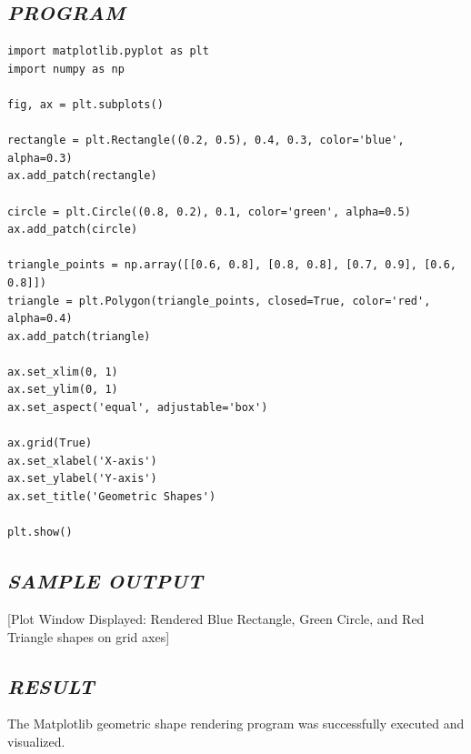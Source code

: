 \documentclass[11pt,a4paper]{article}
\begin{document}
\subsection*{\textit{PROGRAM}}
\begin{lstlisting}[style=pythonstyle]
import matplotlib.pyplot as plt 
import numpy as np 
 
fig, ax = plt.subplots() 
 
rectangle = plt.Rectangle((0.2, 0.5), 0.4, 0.3, color='blue', alpha=0.3) 
ax.add_patch(rectangle) 
 
circle = plt.Circle((0.8, 0.2), 0.1, color='green', alpha=0.5) 
ax.add_patch(circle) 
 
triangle_points = np.array([[0.6, 0.8], [0.8, 0.8], [0.7, 0.9], [0.6, 0.8]]) 
triangle = plt.Polygon(triangle_points, closed=True, color='red', alpha=0.4) 
ax.add_patch(triangle) 
 
ax.set_xlim(0, 1) 
ax.set_ylim(0, 1) 
ax.set_aspect('equal', adjustable='box') 
 
ax.grid(True) 
ax.set_xlabel('X-axis') 
ax.set_ylabel('Y-axis') 
ax.set_title('Geometric Shapes') 
 
plt.show()
\end{lstlisting}

\subsection*{\textit{SAMPLE OUTPUT}}
\begin{tcolorbox}[colback=black!85,colframe=navyblue,title=\textbf{Terminal Output},coltitle=white,fonttitle=\bfseries\small]
\small\ttfamily\color{green!30!white}
[Plot Window Displayed: Rendered Blue Rectangle, Green Circle, and Red Triangle shapes on grid axes]
\end{tcolorbox}

\subsection*{\textit{RESULT}}
The Matplotlib geometric shape rendering program was successfully executed and visualized.

\newpage
\end{document}
